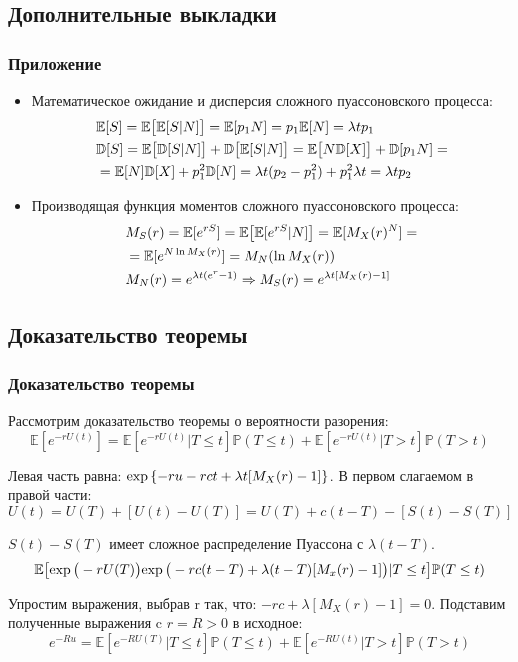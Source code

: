\documentclass[10pt]{beamer}
\newcommand\Exp{{\rm exp \,}}
\newcommand\E{\mathbb{E}}
\newcommand\D{\mathbb{D}}
\newcommand\Pro{\mathbb{P}}
\numberwithin{equation}{section}
\begin{document}
\subsection{Дополнительные выкладки}
\begin{frame}
\frametitle{Приложение}
\begin{itemize}
    \item Математическое ожидание и дисперсия сложного пуассоновского процесса:
    \begin{align}
    \label{eq:PoisExp}
    & \E[S] = \E\big[\E[S|N]\big]=\E[p_1 N] = p_1\E[N] = \lambda t p_1 \\
    \label{eq:PoisVar}
    & \D[S] = \E\big[\D[S|N]\big] + \D\big[\E[S|N]\big] = \E\big[N\D[X]\big] + \D[p_1N] =\notag \\
    & = \E[N]\D[X] + p_1 ^2 \D[N] = \lambda t (p_2 - p_1^2) + p_1^2 \lambda t = \lambda t p_2
    \end{align}
    \item Производящая функция моментов сложного пуассоновского процесса:
    \begin{align}
    & M_S (r) = \mathbb{E}[e^{rS}]=\mathbb{E}\big[\mathbb{E}[e^{rS}|N]\big]=\mathbb{E}[M_X (r)^N]=
    \notag \\
    & = \mathbb{E}[e^{N \ln{M_X (r)}}]= M_N (\ln{M_X (r)}) \\
    & M_N (r) = e^{\lambda t(e^r - 1)} \Rightarrow M_S (r) = e^{\lambda t[M_X (r) - 1]}
    \end{align}
\end{itemize}
\end{frame}


\subsection{Доказательство теоремы}
\begin{frame}
\frametitle{Доказательство теоремы}
\noindent
Рассмотрим доказательство теоремы о вероятности разорения:
\begin{equation}
\E[e^{-rU(t)}] = \E[e^{-rU(t)}|T \leq t]\Pro(T \leq t) + \E[e^{-rU(t)}|T > t]\Pro(T > t)
\end{equation}

\noindent
Левая часть равна: $\Exp\{-ru - rct + \lambda t [M_X(r) - 1]\}$.
В первом слагаемом в правой части:
\begin{equation}
U(t) = U(T) + [U(t) - U(T)] =  U(T) + c(t - T) - [S(t) - S(T)]
\end{equation}

\noindent
$S(t) - S(T)$ имеет сложное распределение Пуассона с $\lambda (t -T)$.
\begin{equation}
\E\big[\Exp\big(-rU(T)\big)\Exp\big(-rc(t-T) + \lambda (t - T)[M_x(r) - 1]\big)|T \leq t\big] 
\Pro (T \leq t)
\end{equation}

\noindent
Упростим выражения, выбрав r так, что: $-rc + \lambda [M_X(r) - 1] = 0$.
Подставим полученные выражения c $r = R > 0$ в исходное:
\begin{equation}
e^{-Ru} = \E[e^{-RU(T)}|T \leq t]\Pro(T \leq t) + \E[e^{-RU(t)}|T > t]\Pro(T > t)
\end{equation}
\end{frame}
\end{document}
